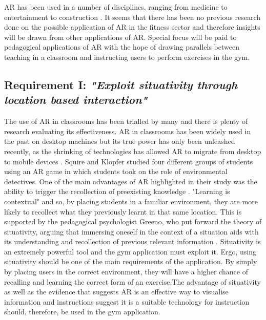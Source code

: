 \documentclass{l4proj}
\begin{document}
AR has been used in a number of disciplines, ranging from medicine to entertainment to construction \cite{azuma_recent_2001}. It seems that there has been no previous research done on the possible application of AR in the fitness sector and therefore insights will be drawn from other applications of AR. Special focus will be paid to pedagogical applications of AR with the hope of drawing parallels between teaching in a classroom and instructing users to perform exercises in the gym. 

\subsection{\textbf{Requirement I:} \textit{"Exploit situativity through location based interaction"}}
\label{requirement_I}

The use of AR in classrooms has been trialled by many and there is plenty of research evaluating its effectiveness. AR in classrooms has been widely used in the past on desktop machines \cite{iordache_comparison_2009} but its true power has only been unleashed recently, as the shrinking of technologies has allowed AR to migrate from desktop to mobile devices \cite{squire_augmented_2007}. Squire and Klopfer studied four different groups of students using an AR game in which students took on the role of environmental detectives. One of the main advantages of AR highlighted in their study was the ability to trigger the recollection of preexisting knowledge \cite{squire_augmented_2007}. "Learning is contextual" \cite{liestol_learning_2011} and so, by placing students in a familiar environment, they are more likely to recollect what they previously learnt in that same location. This is supported by the pedagogical psychologist Greeno, who put forward the theory of situativity, arguing that immersing oneself in the context of a situation aids with its understanding and recollection of previous relevant information \cite{greeno_situativity_1998}. Situativity is an extremely powerful tool and the gym application must exploit it. Ergo, using situativity should be one of the main requirements of the application. By simply by placing users in the correct environment, they will have a higher chance of recalling and learning the correct form of an exercise.The advantage of situativity as well as the evidence that suggests AR is an effective way to visualise information and instructions \cite{squire_augmented_2007} suggest it is a suitable technology for instruction should, therefore, be used in the gym application.
\end{document}
